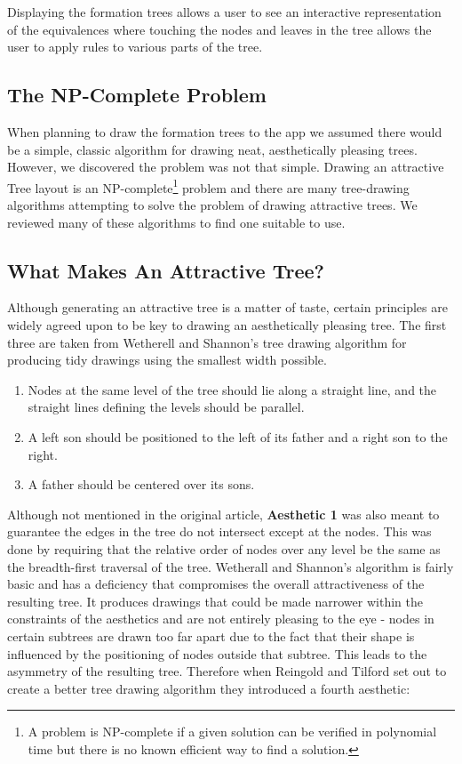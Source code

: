 \documentclass[draft]{report}
\begin{document}
Displaying the formation trees allows a user to see an interactive representation of the equivalences where touching the nodes and leaves in the tree allows the user to apply rules to various parts of the tree.

\subsection{The NP-Complete Problem}

When planning to draw the formation trees to the app we assumed there would be a simple, classic algorithm for drawing neat, aesthetically pleasing trees. However, we discovered the problem was not that simple. Drawing an attractive Tree layout is an NP-complete\footnote{A problem is NP-complete if a given solution can be verified in polynomial time but there is no known efficient way to find a solution. } problem\cite{npcompletetrees} and there are many tree-drawing algorithms attempting to solve the problem of drawing attractive trees. We reviewed many of these algorithms to find one suitable to use.

\subsection{What Makes An Attractive Tree?}

Although generating an attractive tree is a matter of taste, certain principles are widely agreed upon to be key to drawing an aesthetically pleasing tree. The first three are taken from Wetherell and Shannon's tree drawing algorithm for producing tidy drawings using the smallest width possible\cite{tidierdrawingsws}.

\begin{enumerate}[leftmargin=*, align=left, label=\bfseries Aesthetic \arabic*:]
\item Nodes at the same level of the tree should lie along a straight line, and the straight lines defining the levels should be parallel. 

\item A left son should be positioned to the left of its father and a right son to the right.

\item A father should be centered over its sons.
\end{enumerate}

Although not mentioned in the original article, \textbf{Aesthetic 1} was also meant to guarantee the edges in the tree do not intersect except at the nodes. This was done by requiring that the relative order of nodes over any level be the same as the breadth-first traversal of the tree. Wetherall and Shannon's algorithm is fairly basic and has a deficiency that compromises the overall attractiveness of the resulting tree. It produces drawings that could be made narrower within the constraints of the aesthetics and are not entirely pleasing to the eye - nodes in certain subtrees are drawn too far apart due to the fact that their shape is influenced by the positioning of nodes outside that subtree. This leads to the asymmetry of the resulting tree. Therefore when Reingold and Tilford\cite{tidierdrawingsrt} set out to create a better tree drawing algorithm they introduced a fourth aesthetic:
\end{document}
